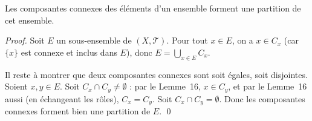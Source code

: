 
\begin{theoreme}[Partition]
Les composantes connexes des éléments d'un ensemble forment une partition de
cet ensemble.
\end{theoreme}

\begin{proof}
Soit $E$ un sous-ensemble de $(X, \mathcal{T})$. Pour tout $x \in E$, on a
$x \in C_x$ (car $\{x\}$ est connexe et inclus dans $E$), donc
$\displaystyle E = \bigcup_{x \in E} C_x$.

Il reste à montrer que deux composantes connexes sont soit égales, soit disjointes.
Soient $x, y \in E$. Soit $C_x \cap C_y \neq \emptyset$ : par le Lemme~16,
$x \in C_y$, et par le Lemme~16 aussi (en échangeant les rôles), $C_x = C_y$.
Soit $C_x \cap C_y = \emptyset$. Donc les composantes connexes forment bien une
partition de $E$. \qed
\end{proof}

